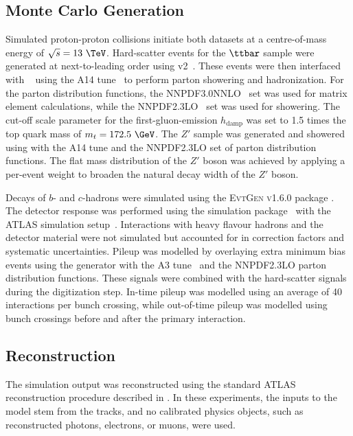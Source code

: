 \subsection{Monte Carlo Generation}

Simulated proton-proton collisions initiate both datasets at a centre-of-mass energy of $\sqrt{s} = 13~\TeV$.
Hard-scatter events for the $\ttbar$ sample were generated at next-to-leading order using \powheg v2~\cite{Powheg1, Powheg2, Powheg3}.
These events were then interfaced with ~\cite{Pythia8} using the \textsc{A14} tune~\cite{A14} to perform parton showering and hadronization.
For the parton distribution functions, the \textsc{NNPDF3.0NNLO}~\cite{PDF3.0} set was used for matrix element calculations, while the \textsc{NNPDF2.3LO}~\cite{PDF2.3} set was used for showering.
The cut-off scale parameter for the first-gluon-emission $h_{\text{damp}}$ was set to 1.5 times the top quark mass of $m_t = 172.5~\GeV$.
The $Z'$ sample was generated and showered using  with the \textsc{A14} tune and the \textsc{NNPDF2.3LO} set of parton distribution functions.
The flat mass distribution of the $Z'$ boson was achieved by applying a per-event weight to broaden the natural decay width of the $Z'$ boson.

Decays of $b$- and $c$-hadrons were simulated using the \textsc{EvtGen v1.6.0} package \cite{EvtGen}.
The detector response was performed using the \geant simulation package~\cite{Geant4} with the ATLAS simulation setup~\cite{ATLASSim}.
Interactions with heavy flavour hadrons and the detector material were not simulated but accounted for in correction factors and systematic uncertainties.
Pileup was modelled by overlaying extra minimum bias events using the  generator with the \textsc{A3} tune~\cite{A3} and the \textsc{NNPDF2.3LO} parton distribution functions.
These signals were combined with the hard-scatter signals during the digitization step.
In-time pileup was modelled using an average of 40 interactions per bunch crossing, while out-of-time pileup was modelled using bunch crossings before and after the primary interaction.

\subsection{Reconstruction}

The simulation output was reconstructed using the standard ATLAS reconstruction procedure described in .
In these experiments, the inputs to the model stem from the tracks, and no calibrated physics objects, such as reconstructed photons, electrons, or muons, were used.

